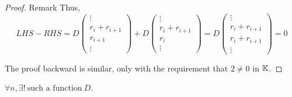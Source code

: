 \begin{proof} {Remark}
    Thus, \[
    LHS - RHS = D \begin{pmatrix}
        \vdots \\ r_i + r_{i+1} \\ r_{i+1} \\ \vdots
    \end{pmatrix} + D\begin{pmatrix}
        \vdots \\ r_i + r_{i+1} \\ r_i \\ \vdots
    \end{pmatrix} = D\begin{pmatrix}
        \vdots \\ r_i + r_{i+1} \\ r_i + r_{i+1} \\ \vdots
    \end{pmatrix} = 0
    \]

    \pfbwd The proof backward is similar, only with the requirement that \(2 \neq 0\) in \(\mathbb{K}\).
\end{proof}

\begin{proposition}
    \(\forall n, \exists! \:\text{such a function}\: D\).
\end{proposition}

